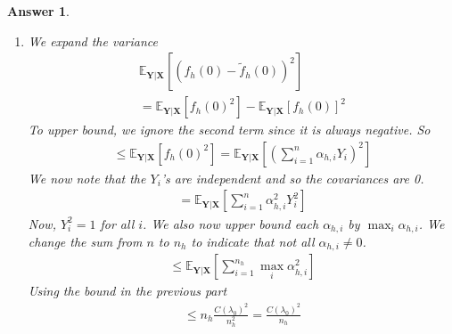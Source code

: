 \documentclass[12pt]{article}
\theoremstyle{colon}
\newtheorem*{answer}{Answer}
\begin{document}
\begin{answer}
\begin{enumerate}[label=\arabic*)]
\begin{enumerate}[label=\alph*)]
          For $\max_i \lvert \alpha_{h,i} \rvert$ one can use all the steps but simply use $\max$ instead of summing across all $i$. Without the sum, $\frac{1}{n_h}$ does not disappear at $(\star)(\star)$ and so we are left with the result $\max_i \lvert \alpha_{h,i} \rvert \leq C(\lambda_0)/n_h$.

        \item We expand the variance
          \begin{gather*}
            \mathbb{E}_{\textbf{Y} | \textbf{X} } [(f_h(0) - \tilde{f}_h(0))^2] \\
            = \mathbb{E}_{\textbf{Y} | \textbf{X} } [f_h(0)^2] - \mathbb{E}_{\textbf{Y} | \textbf{X} } [f_h(0)]^2
          \end{gather*}
          To upper bound, we ignore the second term since it is always negative. So
          \begin{gather*}
            \leq \mathbb{E}_{\textbf{Y} | \textbf{X} } [f_h(0)^2] = \mathbb{E}_{\textbf{Y} | \textbf{X} } [(\sum_{i=1}^n \alpha_{h,i} Y_i)^2]
          \end{gather*}
          We now note that the $Y_i$'s are independent and so the covariances are 0.
          \begin{gather*}
            = \mathbb{E}_{\textbf{Y} | \textbf{X} } [\sum_{i=1}^n \alpha_{h,i}^2 Y_i^2]
          \end{gather*}
          Now, $Y_i^2 = 1$ for all $i$. We also now upper bound each $\alpha_{h,i}$ by $\max_i \alpha_{h,i}$. We change the sum from $n$ to $n_h$ to indicate that not all $\alpha_{h,i} \neq 0$.
          \begin{gather*}
            \leq \mathbb{E}_{\textbf{Y} | \textbf{X} } [\sum_{i=1}^{n_h} \max_i \alpha_{h,i}^2]
          \end{gather*}
          Using the bound in the previous part
          \begin{gather*}
            \leq n_h \frac{C(\lambda_0)^2}{n_h^2} = \frac{C(\lambda_0)^2}{n_h}
          \end{gather*}
      \end{enumerate}


\end{enumerate}
\end{answer}
\end{document}
